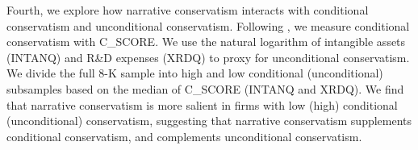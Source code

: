 \documentclass[letterpaper,12pt]{article}
\begin{document}
\begin{spacing}{1.5}
Fourth, we explore how narrative conservatism interacts with conditional conservatism and unconditional conservatism. Following , we measure conditional conservatism with C\_SCORE. We use the natural logarithm of intangible assets (INTANQ) and R\&D expenses (XRDQ) to proxy for unconditional conservatism. We divide the full 8-K sample into high and low conditional (unconditional) subsamples based on the median of C\_SCORE (INTANQ and XRDQ). We find that narrative conservatism is more salient in firms with low (high) conditional (unconditional) conservatism, suggesting that narrative conservatism supplements conditional conservatism, and complements unconditional conservatism. 





\end{spacing}
\end{document}
